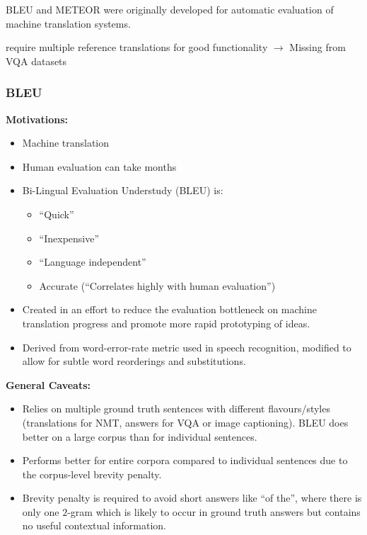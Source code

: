 BLEU and METEOR were originally developed for automatic evaluation of machine translation systems.

{\color{red} require multiple reference translations for good functionality \(\rightarrow\) Missing from VQA datasets}

\subsubsection{BLEU}

\textbf{Motivations:}

\begin{itemize}
    \item Machine translation
    \item Human evaluation can take months
    \item Bi-Lingual Evaluation Understudy (BLEU) is:
    \begin{itemize}
        \item ``Quick''
        \item ``Inexpensive''
        \item ``Language independent''
        \item Accurate (``Correlates highly with human evaluation'')
    \end{itemize}
    \item Created in an effort to reduce the evaluation bottleneck on machine translation progress and promote more rapid prototyping of ideas.
    \item Derived from word-error-rate metric used in speech recognition, modified to allow for subtle word reorderings and substitutions.
\end{itemize}


\textbf{General Caveats:}

\begin{itemize}
    \item Relies on multiple ground truth sentences with different flavours/styles (translations for NMT, answers for VQA or image captioning). BLEU does better on a large corpus than for individual sentences.
    \item Performs better for entire corpora compared to individual sentences due to the corpus-level brevity penalty.
    \item Brevity penalty is required to avoid short answers like ``of the'', where there is only one \(2\)-gram which is likely to occur in ground truth answers but contains no useful contextual information.
\end{itemize}


